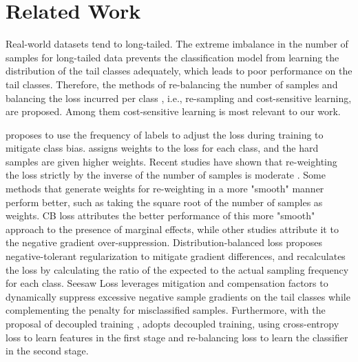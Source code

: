 \documentclass[10pt]{article} %
\begin{document}




\newpage

\hypersetup{hidelinks} 
\tableofcontents
\listoffigures
\listoftables


\newpage

\appendix

\section{Related Work\label{Related Work}}
Real-world datasets tend to long-tailed. The extreme imbalance in the number of samples for long-tailed data prevents the classification model from learning the distribution of the tail classes adequately, which leads to poor performance on the tail classes. Therefore, the methods of re-balancing the number of samples \cite {paper4, paper88, paper89, paper91} and balancing the loss incurred per class \cite {paper92, paper93, paper94}, i.e., re-sampling and cost-sensitive learning, are proposed. Among them cost-sensitive learning is most relevant to our work.

\cite {paper95} proposes to use the frequency of labels to adjust the loss during training to mitigate class bias. \cite {paper68} assigns weights to the loss for each class, and the hard samples are given higher weights. Recent studies have shown that re-weighting the loss strictly by the inverse of the number of samples is moderate \cite {paper96, paper103}. Some methods that generate weights for re-weighting in a more "smooth" manner perform better, such as taking the square root of the number of samples \cite {paper96} as weights. CB loss \cite {paper14} attributes the better performance of this more "smooth" approach to the presence of marginal effects, while other studies \cite {paper24, paper99, paper100} attribute it to the negative gradient over-suppression. Distribution-balanced loss \cite {paper101} proposes negative-tolerant regularization to mitigate gradient differences, and recalculates the loss by calculating the ratio of the expected to the actual sampling frequency for each class. Seesaw Loss \cite {paper100} leverages mitigation and compensation factors to dynamically suppress excessive negative sample gradients on the tail classes while complementing the penalty for misclassified samples. Furthermore, with the proposal of decoupled training \cite {paper10}, \cite {paper4} adopts decoupled training, using cross-entropy loss to learn features in the first stage and re-balancing loss to learn the classifier in the second stage.
\end{document}
